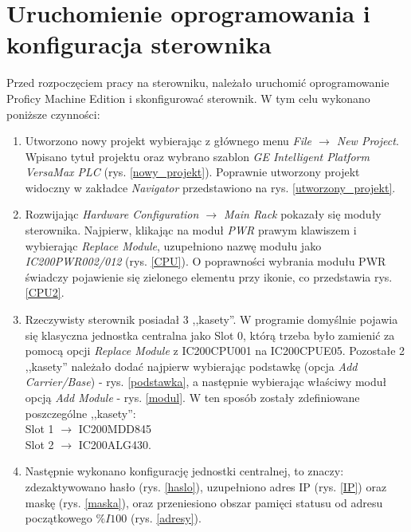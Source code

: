 \documentclass[12pt]{article}
\begin{document}
\section{Uruchomienie oprogramowania i konfiguracja sterownika}
Przed rozpoczęciem pracy na sterowniku, należało uruchomić oprogramowanie Proficy Machine Edition i skonfigurować sterownik. W tym celu wykonano poniższe czynności:
\begin{enumerate}
    \item Utworzono nowy projekt wybierając z głównego menu \textit{File $\rightarrow$ New Project}. Wpisano tytuł projektu oraz wybrano szablon \textit{GE Intelligent Platform VersaMax PLC} (rys. \ref{nowy_projekt}). Poprawnie utworzony projekt widoczny w zakładce \textit{Navigator} przedstawiono na rys. \ref{utworzony_projekt}.
    \item Rozwijając \textit{Hardware Configuration $\rightarrow$ Main Rack} pokazały się moduły sterownika. Najpierw, klikając na moduł \textit{PWR} prawym klawiszem i wybierając \textit{Replace Module}, uzupełniono nazwę modułu jako \textit{IC200PWR002/012} (rys. \ref{CPU}). O poprawności wybrania modułu PWR świadczy pojawienie się zielonego elementu przy ikonie, co przedstawia rys. \ref{CPU2}.
    \item Rzeczywisty sterownik posiadał 3 ,,kasety''. W programie domyślnie pojawia się klasyczna jednostka centralna jako Slot 0, którą trzeba było zamienić za pomocą opcji \textit{Replace Module} z IC200CPU001 na IC200CPUE05. Pozostałe 2 ,,kasety'' należało dodać najpierw wybierając podstawkę (opcja \textit{Add Carrier/Base}) - rys. \ref{podstawka}, a następnie wybierając właściwy moduł opcją \textit{Add Module} - rys. \ref{modul}. W ten sposób zostały zdefiniowane poszczególne ,,kasety'': \\
    Slot 1 $\rightarrow$ IC200MDD845 \\
    Slot 2 $\rightarrow$ IC200ALG430. 
    \item Następnie wykonano konfigurację jednostki centralnej, to znaczy: zdezaktywowano hasło (rys. \ref{haslo}), uzupełniono adres IP (rys. \ref{IP}) oraz maskę (rys. \ref{maska}), oraz przeniesiono obszar pamięci statusu od adresu początkowego $\%I100$ (rys. \ref{adresy}).

\end{enumerate}
\end{document}
